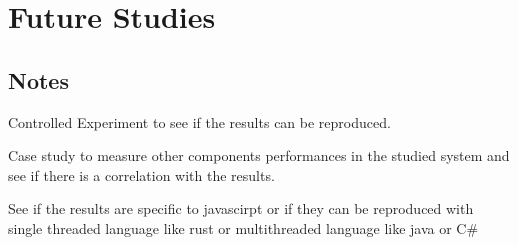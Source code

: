 \section{Future Studies}
\subsection{Notes}
Controlled Experiment to see if the results can be reproduced.

Case study to measure other components performances in the studied system and see if there is a correlation with the results.

See if the results are specific to javascirpt or if they can be reproduced with single threaded language like rust or multithreaded language like java or C\#
